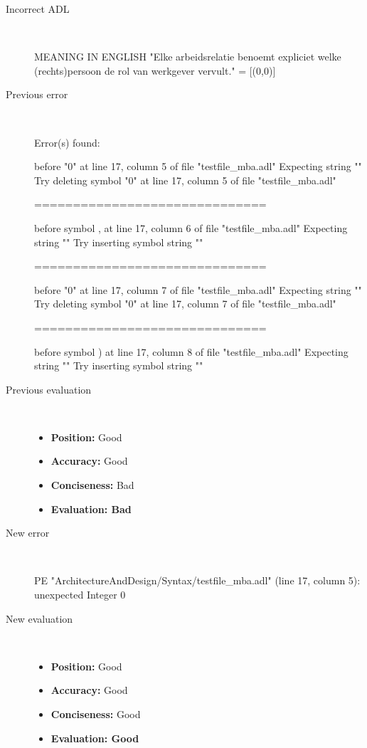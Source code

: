 \hrulefill

\begin{description}
  \item[Incorrect ADL]~\\
\begin{adl}
MEANING IN ENGLISH "Elke arbeidsrelatie benoemt expliciet welke (rechts)persoon de rol van werkgever vervult."
= [(0,0)]\end{adl}
  \item[Previous error]~\\
\begin{haskell}
Error(s) found:

before "0" at line 17, column 5 of file "testfile_mba.adl"
Expecting string ""
Try deleting symbol "0" at line 17, column 5 of file "testfile_mba.adl"

==============================

before symbol , at line 17, column 6 of file "testfile_mba.adl"
Expecting string ""
Try inserting symbol string ""

==============================

before "0" at line 17, column 7 of file "testfile_mba.adl"
Expecting string ""
Try deleting symbol "0" at line 17, column 7 of file "testfile_mba.adl"

==============================

before symbol ) at line 17, column 8 of file "testfile_mba.adl"
Expecting string ""
Try inserting symbol string ""\end{haskell}
  \item[Previous evaluation]~\\
    \begin{itemize}
    \item \textbf{Position:} Good
    \item \textbf{Accuracy:} Good
    \item \textbf{Conciseness:} Bad
    \item \textbf{Evaluation: Bad}
    \end{itemize}
  \item[New error]~\\
\begin{haskell}
PE "ArchitectureAndDesign/Syntax/testfile_mba.adl" (line 17, column 5):
unexpected Integer 0\end{haskell}
  \item[New evaluation]~\\
    \begin{itemize}
    \item \textbf{Position:} Good
    \item \textbf{Accuracy:} Good
    \item \textbf{Conciseness:} Good
    \item \textbf{Evaluation: Good}
    \end{itemize}
  \end{description}

